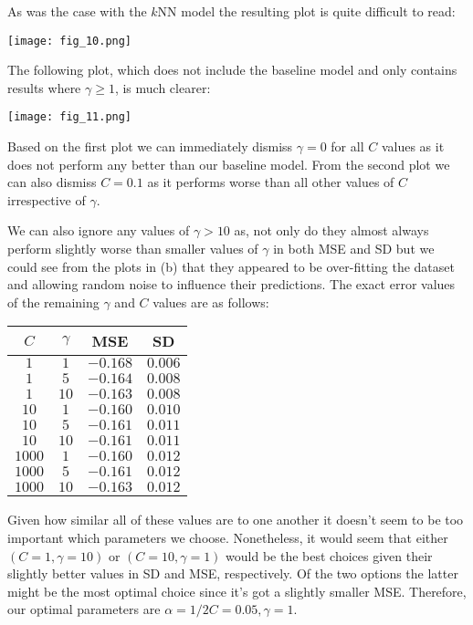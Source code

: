 \documentclass[12pt]{article}
\begin{document}
As was the case with the $k$NN model the resulting plot is quite difficult to read:

\begin{center}
    \texttt{[image: fig\_10.png]}
\end{center}

The following plot, which does not include the baseline model and only contains results where $\gamma \ge 1$, is much clearer:

\begin{center}
    \texttt{[image: fig\_11.png]}
\end{center}

Based on the first plot we can immediately dismiss $\gamma = 0$ for all $C$ values as it does not perform any better than our baseline model. From the second plot we can also dismiss $C = 0.1$ as it performs worse than all other values of $C$ irrespective of $\gamma$.

We can also ignore any values of $\gamma > 10$ as, not only do they almost always perform slightly worse than smaller values of $\gamma$ in both MSE and SD but we could see from the plots in (b) that they appeared to be over-fitting the dataset and allowing random noise to influence their predictions. The exact error values of the remaining $\gamma$ and $C$ values are as follows:

\begin{center}
    \begin{tabular}{|c|c|c|c|}
        \hline
        $C$ & $\gamma$ & MSE & SD \\
        \hline
        $1$ & $1$ & $-0.168$ & $0.006$ \\
        $1$ & $5$ & $-0.164$ & $0.008$ \\
        $1$ & $10$ & $-0.163$ & $0.008$ \\
        $10$ & $1$ & $-0.160$ & $0.010$ \\
        $10$ & $5$ & $-0.161$ & $0.011$ \\
        $10$ & $10$ & $-0.161$ & $0.011$ \\
        $1000$ & $1$ & $-0.160$ & $0.012$ \\
        $1000$ & $5$ & $-0.161$ & $0.012$ \\
        $1000$ & $10$ & $-0.163$ & $0.012$ \\
        \hline
    \end{tabular}
\end{center}

Given how similar all of these values are to one another it doesn't seem to be too important which parameters we choose. Nonetheless, it would seem that either $(C = 1, \gamma = 10)$ or $(C = 10, \gamma = 1)$ would be the best choices given their slightly better values in SD and MSE, respectively. Of the two options the latter might be the most optimal choice since it's got a slightly smaller MSE. Therefore, our optimal parameters are $\alpha = 1/2C = 0.05, \gamma = 1$.
\end{document}
